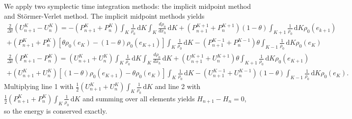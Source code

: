 \documentclass{article}
\begin{document}
We apply two symplectic time integration methods: the implicit midpoint method and St\"{o}rmer-Verlet method. The implicit midpoint methods yields
\begin{equation}
	\begin{aligned}
		\frac{2}{\Delta t} \left(U^K_{n+1}-U^K_n\right) = -(P^K_{n+1}+P^K_n)  \int_K \! \frac{1}{\rho_0} \, \mathrm{d}K   \int_K \! \frac{d \rho_0}{d x_h} \, \mathrm{d}K + (P^{K+1}_{n+1}+P^{K+1}_n) (1-\theta) \int_{K+1} \! \frac{1}{\rho_0} \, \mathrm{d}K \rho_0(e_{k+1}) \\
		+ (P^K_{n+1}+P^K_n) [\theta \rho_0(e_K) - (1-\theta) \rho_0(e_{K+1})] \int_K \! \frac{1}{\rho_0} \, \mathrm{d}K - (P^{K-1}_{n+1}+P^{K-1}_n) \theta \int_{K-1} \! \frac{1}{\rho_0} \, \mathrm{d}K \rho_0(e_K)\\
		\frac{2}{\Delta t} \left(P^K_{n+1}-P^K_n\right) = (U^K_{n+1}+U^K_n) \int_K \! \frac{1}{\rho_0} \, \mathrm{d}K   \int_K \! \frac{d \rho_0}{d x_h} \, \mathrm{d}K + (U^{K+1}_{n+1}+U^{K+1}_n) \theta \int_{K+1} \! \frac{1}{\rho_0} \, \mathrm{d}K \rho_0(e_{K+1}) \\
		+ (U^K_{n+1}+U^K_n) [(1-\theta) \rho_0(e_{K+1}) - \theta \rho_0(e_K)] \int_K \! \frac{1}{\rho_0} \, \mathrm{d}K - (U^{K-1}_{n+1}+U^{K-1}_n) (1-\theta) \int_{K-1} \! \frac{1}{\rho_0} \, \mathrm{d}K \rho_0(e_K).
	\end{aligned}
\end{equation}
Multiplying line 1 with $\frac{1}{2} (U_{n+1}^K + U_n^K) \int_K \! \frac{1}{\rho_0} \, \mathrm{d}K$ and line 2 with $\frac{1}{2} (P_{n+1}^K + P_n^K) \int_K \! \frac{1}{\rho_0} \, \mathrm{d}K$ and summing over all elements yields $H_{n+1}-H_n = 0$, so the energy is conserved exactly. 
\end{document}

